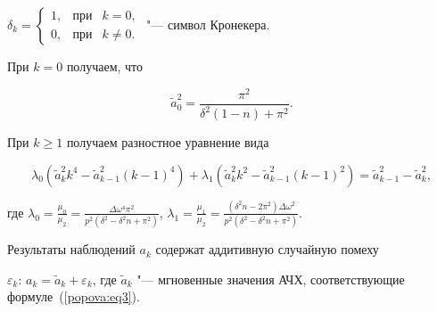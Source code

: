 $\delta _k = \left\{ {\begin{array}{lll}


 1,&\text{при} & k = 0, \\ 


 0,&\text{при} & k \ne 0.


 \end{array}} \right.$ "--- символ Кронекера.





При $k = 0$ получаем, что


\begin{equation}


\label{popova:eq4}


\tilde {a}_0^2 = \frac{\pi ^2}{\delta ^2(1 - n) + \pi ^2}.


\end{equation}


При $k \geqslant 1$ получаем разностное уравнение вида


\begin{equation}


\label{popova:eq5}


\lambda _0 \left( {\tilde {a}_k^2 k^4 - \tilde {a}_{k - 1}^2 \left( {k - 1} 


\right)^4} \right) + \lambda _1 \left( {\tilde {a}_k^2 k^2 - \tilde {a}_{k - 


1}^2 \left( {k - 1} \right)^2} \right) = \tilde {a}_{k - 1}^2 - \tilde 


{a}_k^2 ,


\end{equation}


где $\lambda _0 = \frac{\mu _0 }{\mu _2 } = \frac{\Delta \omega ^4\pi 


^2}{p^2\left( {\delta ^2 - \delta ^2n + \pi ^2} \right)}$, $\lambda _1 = 


\frac{\mu _1 }{\mu _2 } = \frac{\left( {\delta ^2n - 2\pi ^2} \right)\Delta 


\omega ^2}{p^2\left( {\delta ^2 - \delta ^2n + \pi ^2} \right)}$.





Результаты наблюдений $a_k $ содержат аддитивную случайную помеху 


$\varepsilon _k $: $a_k = \tilde {a}_k + \varepsilon _k $, где $\tilde {a}_k 


$ "--- мгновенные значения АЧХ, соответствующие формуле~(\ref{popova:eq3}).





